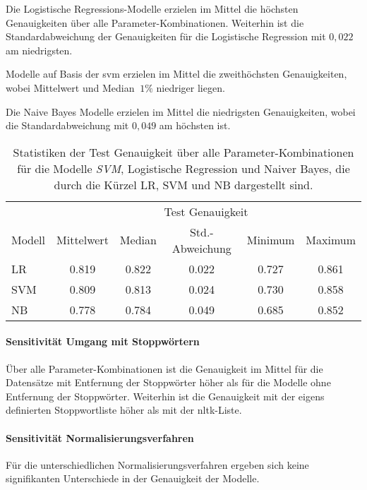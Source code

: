 Die Logistische Regressions-Modelle erzielen im Mittel die höchsten Genauigkeiten über alle Parameter-Kombinationen.
Weiterhin ist die Standardabweichung der Genauigkeiten für die Logistische Regression mit $0,022$ am niedrigsten.

Modelle auf Basis der \gls{svm} erzielen im Mittel die zweithöchsten Genauigkeiten, wobei Mittelwert und Median $~1\%$ niedriger liegen.

Die Naive Bayes Modelle erzielen im Mittel die niedrigsten Genauigkeiten, wobei die Standardabweichung mit $0,049$ am höchsten ist.
\begin{table}
    \center
    \begin{tabular}{lccccc}
        \toprule
        & \multicolumn{5}{c}{Test Genauigkeit} \\
        Modell             & Mittelwert & Median & Std.-Abweichung & Minimum & Maximum \\
        \midrule
        LR                 & 0.819      & 0.822  & 0.022           & 0.727   & 0.861 \\
        SVM                & 0.809      & 0.813  & 0.024           & 0.730   & 0.858 \\
        NB                 & 0.778      & 0.784  & 0.049           & 0.685   & 0.852 \\
        \bottomrule
    \end{tabular}
    \caption{Statistiken der Test Genauigkeit über alle Parameter-Kombinationen für die Modelle \textit{SVM}, Logistische Regression und Naiver Bayes, die durch die Kürzel LR, SVM und NB dargestellt sind.}
    \label{tab:stats-per-model}
\end{table}

\paragraph{Sensitivität Umgang mit Stoppwörtern}

Über alle Parameter-Kombinationen ist die Genauigkeit im Mittel für die Datensätze mit Entfernung der Stoppwörter höher als für die Modelle ohne Entfernung der Stoppwörter.
Weiterhin ist die Genauigkeit mit der eigens definierten Stoppwortliste höher als mit der \gls{nltk}-Liste.

\paragraph{Sensitivität Normalisierungsverfahren}

Für die unterschiedlichen Normalisierungsverfahren ergeben sich keine signifikanten Unterschiede in der Genauigkeit der Modelle.

